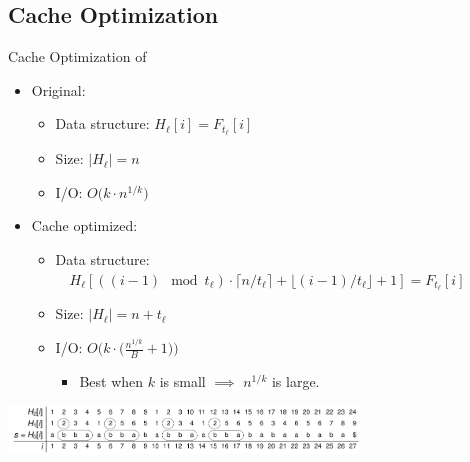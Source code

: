 \documentclass{beamer}
\begin{document}
\subsection{Cache Optimization}
\begin{frame}{Cache Optimization of \fprintk}
    \begin{itemize}
        \item Original:
        \begin{itemize}
            \item Data structure: $H_\ell[i] = F_{t_\ell}[i]$
            \item Size: $|H_\ell| = n$
            \item I/O: $O\big(k\cdot n^{1/k}\big)$
        \end{itemize}
        \item Cache optimized:
        \begin{itemize}
            \item Data structure: \\~~$H_\ell[((i-1)\mod t_\ell)\cdot\lceil n/t_\ell\rceil+\lfloor (i-1)/t_\ell\rfloor+1] = F_{t_\ell}[i]$
            \item Size: $|H_\ell| = n+t_\ell$
            \item I/O: $O\Big(k\cdot\Big(\frac{n^{1/k}}{B}+1\Big)\Big)$
            \begin{itemize}
                \item Best when $k$ is small $\implies$ $n^{1/k}$ is large.
            \end{itemize}
        \end{itemize}
     \end{itemize}
    \begin{center}
        \includegraphics[width=0.7\textwidth,page=2]{../doc/fingerprint.pdf}\\
    \end{center}
\end{frame}
\end{document}
